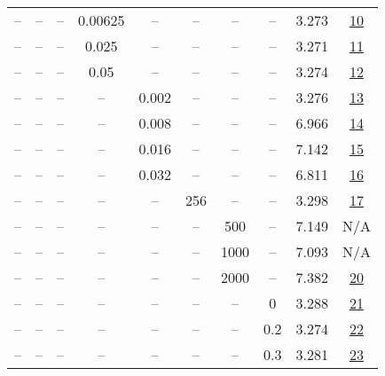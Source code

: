 \begin{table}[H]
\begin{tabular}{cccccccccc}
-- & -- & -- & 0.00625 & -- & -- & -- & -- & 3.273 & \href{https://wandb.ai/stanford-mercury/optimizer-scaling/runs/sweep-300m-6B-sophiaf1c8974lr0.004-wd0.1-minlr0-warmup4000-b10.9-61cb81}{10} \\
-- & -- & -- & 0.025 & -- & -- & -- & -- & 3.271 & \href{https://wandb.ai/stanford-mercury/optimizer-scaling/runs/sweep-300m-6B-sophia0bdec2lr0.004-wd0.1-minlr0-warmup4000-b10.9--3e79ae}{11} \\
-- & -- & -- & 0.05 & -- & -- & -- & -- & 3.274 & \href{https://wandb.ai/stanford-mercury/optimizer-scaling/runs/sweep-300m-6B-sophiafb81f4clr0.004-wd0.1-minlr0-warmup4000-b10.9-d0e589}{12} \\
-- & -- & -- & -- & 0.002 & -- & -- & -- & 3.276 & \href{https://wandb.ai/stanford-mercury/optimizer-scaling/runs/sweep-300m-6B-sophiaf48caf2lr0.002-wd0.1-minlr0-warmup4000-b10.9-419131}{13} \\
-- & -- & -- & -- & 0.008 & -- & -- & -- & 6.966 & \href{https://wandb.ai/stanford-mercury/optimizer-scaling/runs/sweep-300m-6B-sophiaf7ddcdelr0.008-wd0.1-minlr0-warmup4000-b10.9-c2af56}{14} \\
-- & -- & -- & -- & 0.016 & -- & -- & -- & 7.142 & \href{https://wandb.ai/stanford-mercury/optimizer-scaling/runs/sweep-300m-6B-sophia65eca1lr0.016-wd0.1-minlr0-warmup4000-b10.9--549c14}{15} \\
-- & -- & -- & -- & 0.032 & -- & -- & -- & 6.811 & \href{https://wandb.ai/stanford-mercury/optimizer-scaling/runs/sweep-300m-6B-sophiaf839d52lr0.032-wd0.1-minlr0-warmup4000-b10.9-48299d}{16} \\
-- & -- & -- & -- & -- & 256 & -- & -- & 3.298 & \href{https://wandb.ai/stanford-mercury/optimizer-scaling/runs/sweep-300m-6B-sophiafa82475lr0.004-wd0.1-minlr0-warmup4000-b10.9-fdbea7}{17} \\
-- & -- & -- & -- & -- & -- & 500 & -- & 7.149 & N/A \\
-- & -- & -- & -- & -- & -- & 1000 & -- & 7.093 & N/A \\
-- & -- & -- & -- & -- & -- & 2000 & -- & 7.382 & \href{https://wandb.ai/stanford-mercury/optimizer-scaling/runs/sweep-300m-6B-sophia5959balr0.004-wd0.1-minlr0-warmup2000-b10.9--480e3d}{20} \\
-- & -- & -- & -- & -- & -- & -- & 0 & 3.288 & \href{https://wandb.ai/stanford-mercury/optimizer-scaling/runs/sweep-300m-6B-sophiad11a0flr0.004-wd0-minlr0-warmup4000-b10.9-b2-ca019c}{21} \\
-- & -- & -- & -- & -- & -- & -- & 0.2 & 3.274 & \href{https://wandb.ai/stanford-mercury/optimizer-scaling/runs/sweep-300m-6B-sophiaf66c842lr0.004-wd0.2-minlr0-warmup4000-b10.9-cd3965}{22} \\
-- & -- & -- & -- & -- & -- & -- & 0.3 & 3.281 & \href{https://wandb.ai/stanford-mercury/optimizer-scaling/runs/sweep-300m-6B-sophiabcf6b6lr0.004-wd0.3-minlr0-warmup4000-b10.9--8f044b}{23} \\
\bottomrule
\end{tabular}
\end{table}

